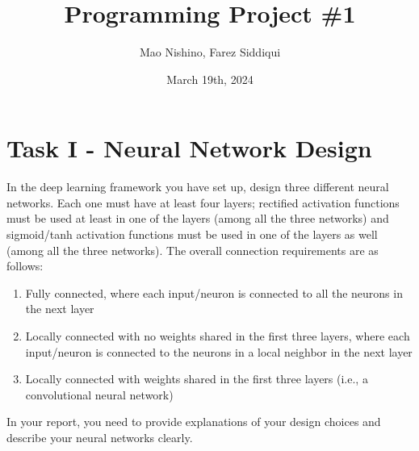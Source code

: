\documentclass[
	12pt, %
]{../Template/fphw}
\title{Programming Project \#1} %
\author{Mao Nishino, Farez Siddiqui} %
\date{March 19th, 2024} %
\institute{Florida State University \\ Department of Computer Science} %
\begin{document}
\maketitle %


\section*{Task I - Neural Network Design}

\begin{problem}
In the deep learning framework you have set up, design three different neural networks. Each one must have
at least four layers; rectified activation functions must be used at least in one of the layers (among all the
three networks) and sigmoid/tanh activation functions must be used in one of the layers as well (among
all the three networks). The overall connection requirements are as follows:
\begin{enumerate}[label = (\arabic*)]
\item Fully connected, where each input/neuron is connected to all the neurons in the next layer
\item Locally connected with no weights shared in the first three layers, where each input/neuron is
connected to the neurons in a local neighbor in the next layer
\item Locally connected with weights shared in the first three layers (i.e., a convolutional neural network)
\end{enumerate}
In your report, you need to provide explanations of your design choices and describe your neural networks clearly.
\end{problem}

\end{document}
